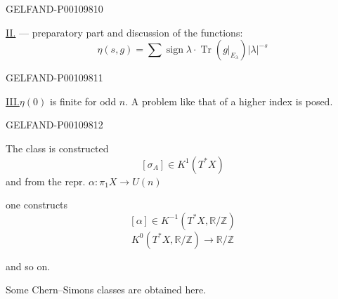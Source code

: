 \begin{GelfandAdjacentEvidence}{GELFAND-P001098}{10}


\underline{II.} — preparatory part and discussion of the functions:
\[
\eta(s,g)=\sum\operatorname{sign}\lambda\cdot
\operatorname{Tr}(g|_{E_\lambda})\lvert\lambda\rvert^{-s}
\]
\end{GelfandAdjacentEvidence}
\begin{GelfandAdjacentEvidence}{GELFAND-P001098}{11}


\underline{III.} $\eta(0)$ is finite for odd $n$.
A problem like that of a higher index is posed.
\end{GelfandAdjacentEvidence}
\begin{GelfandAdjacentEvidence}{GELFAND-P001098}{12}


The class is constructed
\[
[\sigma_A]\in K^1(T^*X)
\]
and from the repr. $\alpha:\pi_1 X\to U(n)$

one constructs
\[
[\alpha]\in K^{-1}(T^*X,\mathbb R/\mathbb Z)
\]
\[
K^0(T^*X,\mathbb R/\mathbb Z)\to\mathbb R/\mathbb Z
\]
\end{GelfandAdjacentEvidence}


and so on.

Some Chern–Simons classes are obtained here.


